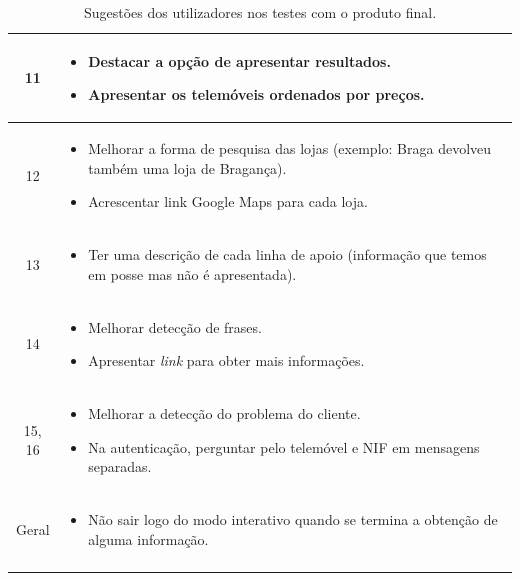 \documentclass[11pt, a4paper]{article}
\begin{document}
\begin{longtable}{|c|m{12cm}|}
        11 & \begin{itemize}[leftmargin=0.5cm]
            \setlength\itemsep{0em}
            \item Destacar a opção de apresentar resultados.
            \item Apresentar os telemóveis ordenados por preços.
        \end{itemize}\\ \hline
        12 & \begin{itemize}[leftmargin=0.5cm]
            \setlength\itemsep{0em}
            \item Melhorar a forma de pesquisa das lojas (exemplo: Braga devolveu também uma loja de Bragança).
            \item Acrescentar link Google Maps para cada loja.
        \end{itemize}\\ \hline
        13 & \begin{itemize}[leftmargin=0.5cm]
            \setlength\itemsep{0em}
            \item Ter uma descrição de cada linha de apoio (informação que temos em posse mas não é apresentada).
        \end{itemize}\\ \hline
        14 & \begin{itemize}[leftmargin=0.5cm]
            \setlength\itemsep{0em}
            \item Melhorar detecção de frases.
            \item Apresentar \emph{link} para obter mais informações.
        \end{itemize}\\ \hline
        15, 16 & \begin{itemize}[leftmargin=0.5cm]
            \setlength\itemsep{0em}
            \item Melhorar a detecção do problema do cliente.
            \item Na autenticação, perguntar pelo telemóvel e NIF em mensagens separadas.
        \end{itemize}\\ \hline
        Geral & \begin{itemize}[leftmargin=0.5cm]
            \setlength\itemsep{0em}
            \item Não sair logo do modo interativo quando se termina a obtenção de alguma informação.
        \end{itemize}\\ \hline
    \caption{Sugestões dos utilizadores nos testes com o produto final.}
    \label{tab:my_label2}
\end{longtable}
\end{document}

